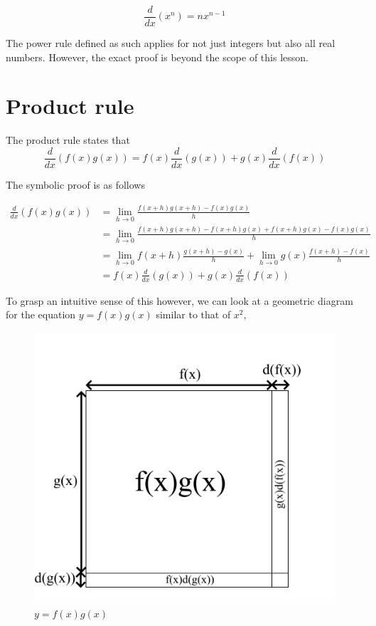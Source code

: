\documentclass[a4paper,12pt,oneside]{book}
\begin{document}
$$\frac{d}{dx}(x^n)=nx^{n-1}$$

\noindent The power rule defined as such applies for not just integers but also all real numbers. However, the exact proof is beyond the scope of this lesson.

\section{Product rule}

The product rule states that
$$\frac{d}{dx}(f(x)g(x))=f(x)\frac{d}{dx}(g(x))+g(x)\frac{d}{dx}(f(x))$$

\noindent The symbolic proof is as follows

$$
\begin{aligned}
\frac{d}{dx}(f(x)g(x))&=\lim_{h\to 0}\frac{f(x+h)g(x+h)-f(x)g(x)}{h}\\
&=\lim_{h\to 0}\frac{{f({x+h})g({x+h})-f({x+h})g(x)+f({x+h})g(x)-f(x)g(x)}}{h}\\
&=\lim_{h\to 0}f(x+h)\frac{g(x+h)-g(x)}{h}+\lim_{h\to 0}g(x)\frac{f(x+h)-f(x)}{h}\\
&=f(x)\frac{d}{dx}(g(x))+g(x)\frac{d}{dx}(f(x))
\end{aligned}
$$

\noindent To grasp an intuitive sense of this however, we can look at a geometric diagram for the equation $y=f(x)g(x)$ similar to that of $x^2$,

\begin{figure}[H]
    \begin{center}
        \includegraphics[scale=0.35]{img/zayan/prodrule.png}
        \caption{$y=f(x)g(x)$}
        \label{fig:prodrule}
    \end{center}
\end{figure}
\end{document}

